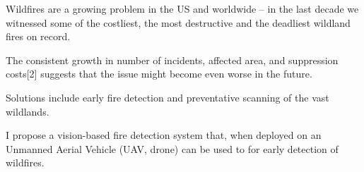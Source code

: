 Wildfires are a growing problem in the US and worldwide -- 
in the last decade we witnessed some of the costliest, the most destructive and the deadliest wildland fires on record.

The consistent growth in number of incidents, affected area, and suppression costs[2] suggests that the issue
might become even worse in the future.

Solutions include early fire detection and preventative scanning of the vast wildlands.

I propose a vision-based fire detection system that, when deployed on an Unmanned Aerial Vehicle (UAV, drone) can be used to for early detection of wildfires. \cite{anastasiu-dsaa2016} %